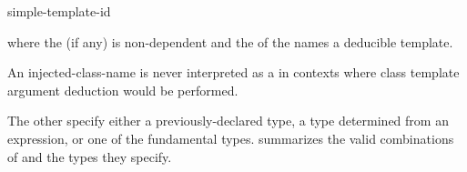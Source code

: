 \begin{ncsimplebnf}
   simple-template-id
\end{ncsimplebnf}

where the  (if any) is non-dependent and
the  of the 
names a deducible template.
\begin{note}
An injected-class-name is never interpreted as a 
in contexts where class template argument deduction would be performed.
\end{note}
The other
specify either a previously-declared type, a type determined from an
expression, or one of the
fundamental types.
 summarizes the valid combinations of
and the types they specify.

